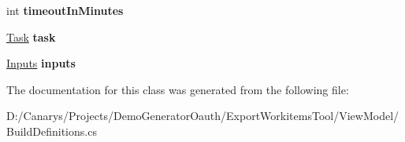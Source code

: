 \begin{DoxyCompactItemize}
int {\bfseries timeout\+In\+Minutes}
\item 
\mbox{\label{class_templates_generator_tool_1_1_view_model_1_1_build_definitions_1_1_build_aba9475025ba417b25d181ec9b0ae09a2}} 
\mbox{\hyperlink{class_templates_generator_tool_1_1_view_model_1_1_build_definitions_1_1_task}{Task}} {\bfseries task}
\item 
\mbox{\label{class_templates_generator_tool_1_1_view_model_1_1_build_definitions_1_1_build_a424959028e2430c50fcfe322638a6afb}} 
\mbox{\hyperlink{class_templates_generator_tool_1_1_view_model_1_1_build_definitions_1_1_inputs}{Inputs}} {\bfseries inputs}
\end{DoxyCompactItemize}


The documentation for this class was generated from the following file\+:\begin{DoxyCompactItemize}
\item 
D\+:/\+Canarys/\+Projects/\+Demo\+Generator\+Oauth/\+Export\+Workitems\+Tool/\+View\+Model/Build\+Definitions.\+cs\end{DoxyCompactItemize}
